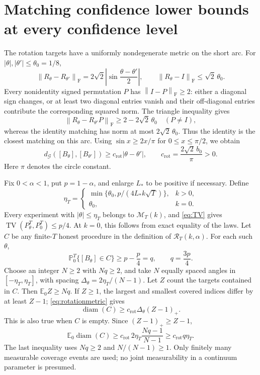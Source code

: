 \documentclass[11pt,a4paper]{article}
\numberwithin{equation}{section}
\newcommand{\E}{\mathbb E}
\newcommand{\Prob}{\mathbb P}
\newcommand{\cM}{\mathcal M}
\newcommand{\cG}{\mathcal G}
\newcommand{\F}{\mathrm F}
\newcommand{\norm}[1]{\left\lVert #1\right\rVert}
\DeclareMathOperator{\diam}{diam}
\DeclareMathOperator{\TV}{TV}
\begin{document}
\section{Matching confidence lower bounds at every confidence level}
\label{sec:lower}
The rotation targets have a uniformly nondegenerate metric on the short
arc. For \(|\theta|,|\theta'|\le\theta_0=1/8\),
\[
 \norm{R_\theta-R_{\theta'}}_{\F}
 =2\sqrt2\left|\sin\frac{\theta-\theta'}2\right|,
 \qquad \norm{R_\theta-I}_{\F}\le\sqrt2\,\theta_0.
\]
Every nonidentity signed permutation \(P\) has
\(\norm{I-P}_{\F}\ge2\): either a diagonal sign changes, or at least
two diagonal entries vanish and their off-diagonal entries contribute
the corresponding squared norm. The triangle inequality gives
\[
 \norm{R_\theta-R_{\theta'}P}_{\F}
 \ge2-2\sqrt2\,\theta_0\quad(P\ne I),
\]
whereas the identity matching has norm at most \(2\sqrt2\,\theta_0\).
Thus the identity is the closest matching on this arc.
Using \(\sin x\ge2x/\pi\) for \(0\le x\le\pi/2\), we obtain
\begin{equation}\label{eq:rotationmetric}
 d_{\cG}([B_\theta],[B_{\theta'}])
 \ge c_{\mathrm{rot}}|\theta-\theta'|,\qquad
 c_{\mathrm{rot}}=\frac{2\sqrt2\,b_0}{\pi}>0.
\end{equation}
Here \(\pi\) denotes the circle constant.

Fix \(0<\alpha<1\), put \(p=1-\alpha\), and enlarge \(L_*\) to be
positive if necessary. Define
\[
 \eta_T=
 \begin{cases}
  \min\{\theta_0,p/(4L_*k\sqrt T)\},&k>0,\\
  \theta_0,&k=0.
 \end{cases}
\]
Every experiment with \(|\theta|\le\eta_T\) belongs to \(\cM_T(k)\),
and \eqref{eq:TV} gives \(\TV(P_\theta^T,P_0^T)\le p/4\).
At \(k=0\), this follows from exact equality of the laws.
Let \(C\) be any finite-\(T\) honest procedure in the definition of
\(\mathcal R_T(k,\alpha)\). For each such \(\theta\),
\begin{equation}\label{eq:gridcoverage}
 \Prob_0^T\{[B_\theta]\in C\}
 \ge p-\frac p4=q,\qquad q=\frac{3p}{4}.
\end{equation}
Choose an integer \(N\ge2\) with \(Nq\ge2\), and take \(N\) equally
spaced angles in \([-\eta_T,\eta_T]\), with spacing
\(\Delta_\theta=2\eta_T/(N-1)\).
Let \(Z\) count the targets contained in \(C\).
Then \(\E_0Z\ge Nq\).
If \(Z\ge1\), the largest and smallest covered indices differ by at
least \(Z-1\); \eqref{eq:rotationmetric} gives
\[
 \diam(C)\ge c_{\mathrm{rot}}\Delta_\theta(Z-1)_+.
\]
This is also true when \(C\) is empty.
Since \((Z-1)_+\ge Z-1\),
\begin{equation}\label{eq:gridlower}
 \E_0\diam(C)
 \ge c_{\mathrm{rot}}\,2\eta_T\frac{Nq-1}{N-1}
 \ge c_{\mathrm{rot}}q\eta_T.
\end{equation}
The last inequality uses \(Nq\ge2\) and \(N/(N-1)\ge1\).
Only finitely many measurable coverage events are used; no joint
measurability in a continuum parameter is presumed.
\end{document}
